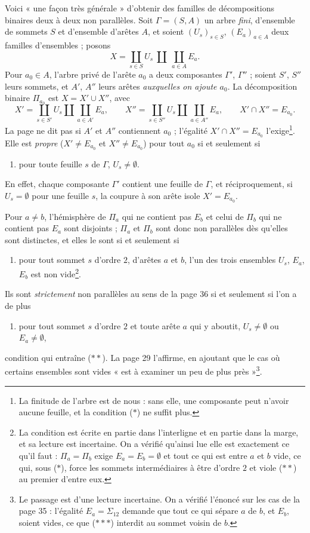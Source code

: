 \documentclass[11pt,a4paper]{article}
\begin{document}
Voici « une façon très générale » d'obtenir des familles de décompositions
binaires deux à deux non parallèles. Soit $\Gamma = (S, A)$ un arbre
\emph{fini}, d'ensemble de sommets $S$ et d'ensemble d'arêtes $A$, et soient
$(U_s)_{s \in S}$, $(E_a)_{a \in A}$ deux familles d'ensembles ; posons
\[
X = \coprod_{s \in S} U_s \ \amalg\ \coprod_{a \in A} E_a .
\]
Pour $a_0 \in A$, l'arbre privé de l'arête $a_0$ a deux composantes
$\Gamma'$, $\Gamma''$ ; soient $S'$, $S''$ leurs sommets, et $A'$, $A''$
leurs arêtes \emph{auxquelles on ajoute $a_0$}. La décomposition binaire
$\Pi_{a_0}$ est $X = X' \cup X''$, avec
\[
X' = \coprod_{s \in S'} U_s \amalg \coprod_{a \in A'} E_a, \qquad
X'' = \coprod_{s \in S''} U_s \amalg \coprod_{a \in A''} E_a, \qquad
X' \cap X'' = E_{a_0} .
\]
La page ne dit pas si $A'$ et $A''$ contiennent $a_0$ ; l'égalité $X' \cap X''
= E_{a_0}$ l'exige\footnote{La finitude de l'arbre est de nous : sans elle,
une composante peut n'avoir aucune feuille, et la condition ($*$) ne suffit
plus.}.
Elle est \emph{propre} ($X' \neq E_{a_0}$ et $X'' \neq E_{a_0}$) pour tout
$a_0$ si et seulement si
\begin{enumerate}
  \item[($*$)] pour toute feuille $s$ de $\Gamma$, $U_s \neq \emptyset$.
\end{enumerate}
En effet, chaque composante $\Gamma'$ contient une feuille de $\Gamma$, et
réciproquement, si $U_s = \emptyset$ pour une feuille $s$, la coupure à son
arête isole $X' = E_{a_0}$.

Pour $a \neq b$, l'hémisphère de $\Pi_a$ qui ne contient pas $E_b$ et celui
de $\Pi_b$ qui ne contient pas $E_a$ sont disjoints ; $\Pi_a$ et $\Pi_b$ sont donc non
parallèles dès qu'elles sont distinctes, et elles le sont si et seulement
si
\begin{enumerate}
  \item[($**$)] pour tout sommet $s$ d'ordre $2$, d'arêtes $a$ et $b$, l'un
  des trois ensembles $U_s$, $E_a$, $E_b$ est non vide\footnote{La condition
  est écrite en partie dans l'interligne et en partie dans la marge, et sa
  lecture est incertaine. On a vérifié qu'ainsi lue elle est exactement ce
  qu'il faut : $\Pi_a = \Pi_b$ exige $E_a = E_b = \emptyset$ et tout ce qui
  est entre $a$ et $b$ vide, ce qui, sous ($*$), force les sommets
  intermédiaires à être d'ordre $2$ et viole ($**$) au premier d'entre
  eux.}.
\end{enumerate}
Ils sont \emph{strictement} non parallèles au sens de la page 36 si et
seulement si l'on a de plus
\begin{enumerate}
  \item[($*{*}*$)] pour tout sommet $s$ d'ordre $2$ et toute arête $a$ qui y
  aboutit, $U_s \neq \emptyset$ ou $E_a \neq \emptyset$,
\end{enumerate}
condition qui entraîne ($**$). La page 29 l'affirme, en ajoutant que le cas
où certains ensembles sont vides « est à examiner un peu de plus
près »\footnote{Le passage est d'une lecture incertaine. On a vérifié
l'énoncé sur les cas de la page 35 : l'égalité $E_a = \Sigma_{12}$ demande
que tout ce qui sépare $a$ de $b$, et $E_b$, soient vides, ce que ($*{*}*$)
interdit au sommet voisin de $b$.}.
\end{document}
